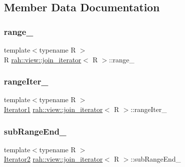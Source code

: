 \subsection{Member Data Documentation}
\mbox{\label{structrah_1_1view_1_1join__iterator_ad167fb9c44c21ad59d5acfa9031e9153}} 
\subsubsection{\texorpdfstring{range\_}{range\_}}
{\footnotesize\ttfamily template$<$typename R $>$ \\
R \mbox{\hyperlink{structrah_1_1view_1_1join__iterator}{rah\+::view\+::join\+\_\+iterator}}$<$ R $>$\+::range\+\_\+}

\mbox{\label{structrah_1_1view_1_1join__iterator_a754b7bdee5ca2b23868a402c2c3cfcc2}} 
\subsubsection{\texorpdfstring{rangeIter\_}{rangeIter\_}}
{\footnotesize\ttfamily template$<$typename R $>$ \\
\mbox{\hyperlink{structrah_1_1view_1_1join__iterator_a8b71c6f25eee2915e2a8afc6e024196d}{Iterator1}} \mbox{\hyperlink{structrah_1_1view_1_1join__iterator}{rah\+::view\+::join\+\_\+iterator}}$<$ R $>$\+::range\+Iter\+\_\+}

\mbox{\label{structrah_1_1view_1_1join__iterator_a70b890cac5aaa7c6f65f8c8efe369f0d}} 
\subsubsection{\texorpdfstring{subRangeEnd\_}{subRangeEnd\_}}
{\footnotesize\ttfamily template$<$typename R $>$ \\
\mbox{\hyperlink{structrah_1_1view_1_1join__iterator_ae03a066174f3422c70d0e3c22e68d9f7}{Iterator2}} \mbox{\hyperlink{structrah_1_1view_1_1join__iterator}{rah\+::view\+::join\+\_\+iterator}}$<$ R $>$\+::sub\+Range\+End\+\_\+}

